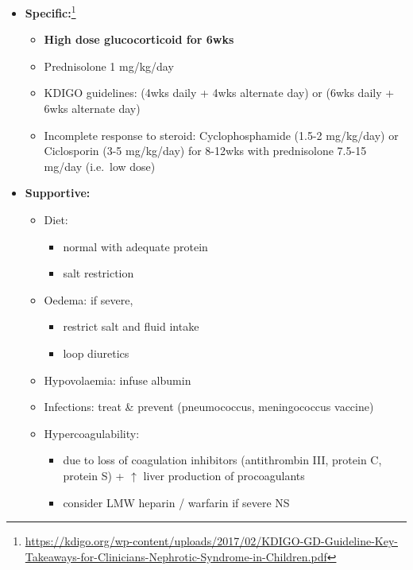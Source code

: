 \documentclass[
  12pt,
]{memoir}
\providecommand{\tightlist}{%
  \setlength{\itemsep}{0pt}\setlength{\parskip}{0pt}}
\begin{document}
\begin{itemize}
\tightlist
\item
  \textbf{Specific:}\footnote{\url{https://kdigo.org/wp-content/uploads/2017/02/KDIGO-GD-Guideline-Key-Takeaways-for-Clinicians-Nephrotic-Syndrome-in-Children.pdf}}

  \begin{itemize}
  \tightlist
  \item
    \textbf{High dose glucocorticoid for 6wks}
  \item
    Prednisolone 1 mg/kg/day
  \item
    KDIGO guidelines: (4wks daily + 4wks alternate day) or (6wks daily +
    6wks alternate day)
  \item
    Incomplete response to steroid: Cyclophosphamide (1.5-2 mg/kg/day)
    or Ciclosporin (3-5 mg/kg/day) for 8-12wks with prednisolone 7.5-15
    mg/day (i.e.~low dose)
  \end{itemize}
\item
  \textbf{Supportive:}

  \begin{itemize}
  \tightlist
  \item
    Diet:

    \begin{itemize}
    \tightlist
    \item
      normal with adequate protein
    \item
      salt restriction
    \end{itemize}
  \item
    Oedema: if severe,

    \begin{itemize}
    \tightlist
    \item
      restrict salt and fluid intake
    \item
      loop diuretics
    \end{itemize}
  \item
    Hypovolaemia: infuse albumin
  \item
    Infections: treat \& prevent (pneumococcus, meningococcus vaccine)
  \item
    Hypercoagulability:

    \begin{itemize}
    \tightlist
    \item
      due to loss of coagulation inhibitors (antithrombin III, protein
      C, protein S) + \(\uparrow\) liver production of procoagulants
    \item
      consider LMW heparin / warfarin if severe NS
    \end{itemize}
  \end{itemize}
\end{itemize}
\end{document}
